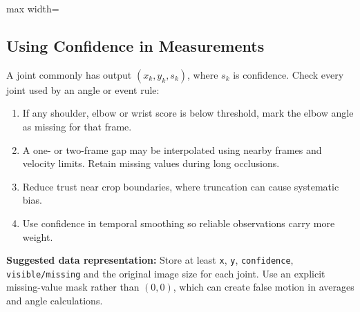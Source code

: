 \documentclass[11pt,a4paper,oneside]{report}
\begin{document}
\begin{center}
\begin{adjustbox}{max width=\linewidth}
\end{adjustbox}
\end{center}

\subsection{Using Confidence in Measurements}

A joint commonly has output $(x_k,y_k,s_k)$, where $s_k$ is confidence. Check every joint used by an angle or event rule:

\begin{enumerate}
  \item If any shoulder, elbow or wrist score is below threshold, mark the elbow angle as missing for that frame.
  \item A one- or two-frame gap may be interpolated using nearby frames and velocity limits. Retain missing values during long occlusions.
  \item Reduce trust near crop boundaries, where truncation can cause systematic bias.
  \item Use confidence in temporal smoothing so reliable observations carry more weight.
\end{enumerate}

\begin{plainBox}
\textbf{Suggested data representation:}\quad
Store at least \texttt{x}, \texttt{y}, \texttt{confidence}, \texttt{visible/missing} and the original image size for each joint. Use an explicit missing-value mask rather than $(0,0)$, which can create false motion in averages and angle calculations.
\end{plainBox}
\end{document}
